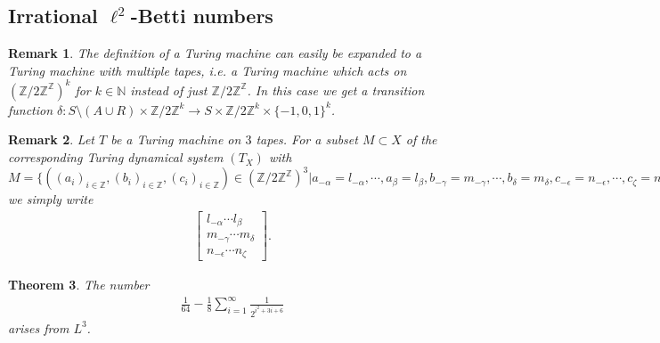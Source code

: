\documentclass[12pt,a4paper]{scrartcl}
\theoremstyle{plain}
\newtheorem{Theorem}{Theorem}[section]
\newtheorem{Remark}[Theorem]{Remark}
\theoremstyle{definition}
\numberwithin{equation}{section}
\newcommand{\Z}{\mathbb{Z}} %
\newcommand{\N}{\mathbb{N}} %
\newcommand{\2}{\mathbb{Z} / 2 \mathbb{Z}}
\newcommand{\1}{\bar{1}}
\newcommand{\0}{\bar{0}}
\begin{document}
\subsection{Irrational $\ell^2$-Betti numbers}
\begin{Remark}
	The definition of a Turing machine can easily be expanded to a Turing machine with multiple tapes, i.e. a Turing machine which acts on $(\2^\Z)^k$ for $k \in \N$ instead of just $\2^\Z$. In this case we get a transition function $\delta: S \setminus(A \cup R) \times \2^k \to S \times \2^k \times \{-1, 0, 1\}^k$.
\end{Remark}
\begin{Remark}
	Let $T$ be a Turing machine on $3$ tapes. For a subset $M \subset X$ of the corresponding Turing dynamical system $(T_X)$ with $M = \{((a_i)_{i \in \Z}, (b_i)_{i \in \Z}, (c_i)_{i \in \Z}) \in (\2^\Z)^3 | a_{-\alpha} = l_{-\alpha}, \cdots, a_\beta = l_\beta, b_{-\gamma} = m_{-\gamma}, \cdots, b_\delta = m_\delta, c_{-\epsilon} = n_{-\epsilon}, \cdots, c_\zeta = n_\zeta \} \ \alpha, \beta, \gamma, \delta, \epsilon\ \zeta \in \N$ we simply write
	\begin{align*}
		\begin{bmatrix}
			l_{-\alpha} \cdots l_\beta \\
			m_{-\gamma} \cdots m_\delta \\
			n_{-\epsilon} \cdots n_\zeta
		\end{bmatrix}.
	\end{align*}
\end{Remark}
\begin{Theorem}
	The number
	\begin{align*}
		\frac{1}{64} - \frac{1}{8} \sum_{i = 1}^{\infty} \frac{1}{2^{i^2 + 3i + 6}}
	\end{align*}
	arises from $L^3$.
\end{Theorem}
\end{document}
